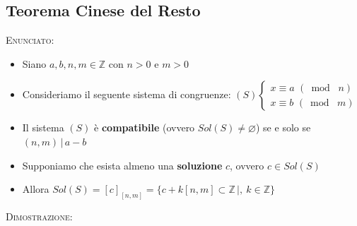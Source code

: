 \documentclass[10pt]{article}
\begin{document}
\subsection{Teorema Cinese del Resto}
\textsc{Enunciato:}
\begin{itemize}
\item
Siano $a,b,n,m \in \mathbb{Z}$ con $n > 0$ e $m > 0$
\item
Consideriamo il seguente sistema di congruenze: $(S) \begin{cases} x \equiv a \,\, (\bmod \,\,n) \\ x \equiv b \,\, (\bmod \,\, m) \end{cases}$
\item
Il sistema $(S)$ è \textbf{compatibile} (ovvero $Sol(S) \neq \varnothing$) se e solo se $(n,m) \,|\, a-b$
\item
Supponiamo che esista almeno una \textbf{soluzione} $c$, ovvero $c \in Sol(S)$
\item
Allora $Sol(S) = \left[c\right]_{\left[n,m\right]} = \{c + k\left[n,m\right] \subset \mathbb{Z} \,|,\ k \in \mathbb{Z}\}$
\end{itemize}
\textsc{Dimostrazione:}
\end{document}
